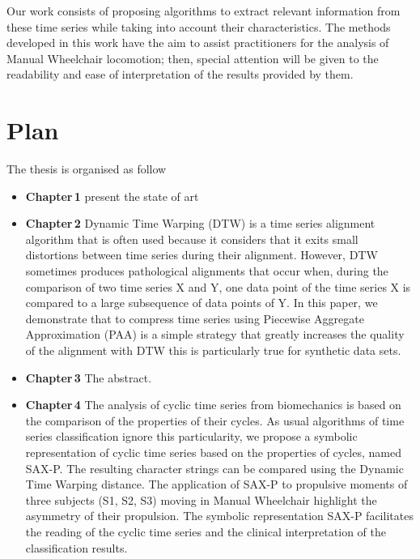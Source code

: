 Our work consists of proposing algorithms to extract relevant information from these time series while taking into account their characteristics. The methods developed in this work have the aim to assist practitioners for the analysis of Manual Wheelchair locomotion; then, special attention will be given to the readability and ease of interpretation of the results provided by them.


\section*{Plan}

The thesis is organised as follow
\begin{itemize}
\item \textbf{Chapter\,1} present the state of art
\item \textbf{Chapter\,2}  Dynamic Time Warping (DTW) is a time series alignment algorithm that is often used because it
 considers that it exits small distortions between time series during their alignment.  However, DTW
 sometimes produces pathological alignments that occur when, during the comparison of two time series
 X and Y, one data point of the time series X is compared to a large subsequence of data points of Y.
 In this paper, we demonstrate that to compress time series using Piecewise Aggregate Approximation
 (PAA) is a simple strategy that greatly increases the quality of the alignment with DTW this is
 particularly true for synthetic data sets.
\item \textbf{Chapter\,3} The abstract.
\item \textbf{Chapter\,4} The analysis of cyclic time series from biomechanics is based on the
comparison of the properties of their cycles. As usual algorithms of time 
series classification ignore this particularity, we propose
a symbolic representation of cyclic time series based on the properties
of cycles, named SAX-P. The resulting character strings can be compared
using the Dynamic Time Warping distance. The application of SAX-P
to propulsive moments of three subjects (S1, S2, S3) moving in Manual
Wheelchair highlight the asymmetry of their propulsion. The symbolic representation 
SAX-P facilitates the reading of
the cyclic time series and the clinical interpretation of the classification results. 
\end{itemize}


